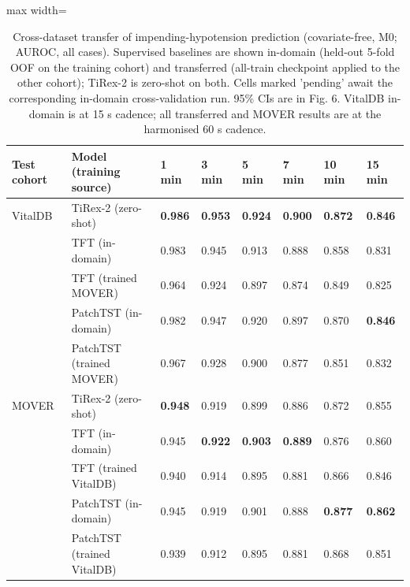 \documentclass[10pt]{article}
\begin{document}
\begin{table}[H]\centering\footnotesize
\caption{Cross-dataset transfer of impending-hypotension prediction (covariate-free, M0; AUROC, all cases). Supervised baselines are shown in-domain (held-out 5-fold OOF on the training cohort) and transferred (all-train checkpoint applied to the other cohort); TiRex-2 is zero-shot on both. Cells marked 'pending' await the corresponding in-domain cross-validation run. 95\% CIs are in Fig. 6. VitalDB in-domain is at 15 s cadence; all transferred and MOVER results are at the harmonised 60 s cadence.}
\begin{adjustbox}{max width=\textwidth}
\begin{tabular}{llllllll}
\toprule
\textbf{Test cohort} & \textbf{Model (training source)} & \textbf{1 min} & \textbf{3 min} & \textbf{5 min} & \textbf{7 min} & \textbf{10 min} & \textbf{15 min} \\
\midrule
VitalDB & TiRex-2 (zero-shot) & \textbf{0.986} & \textbf{0.953} & \textbf{0.924} & \textbf{0.900} & \textbf{0.872} & \textbf{0.846} \\
 & TFT (in-domain) & 0.983 & 0.945 & 0.913 & 0.888 & 0.858 & 0.831 \\
 & TFT (trained MOVER) & 0.964 & 0.924 & 0.897 & 0.874 & 0.849 & 0.825 \\
 & PatchTST (in-domain) & 0.982 & 0.947 & 0.920 & 0.897 & 0.870 & \textbf{0.846} \\
 & PatchTST (trained MOVER) & 0.967 & 0.928 & 0.900 & 0.877 & 0.851 & 0.832 \\
MOVER & TiRex-2 (zero-shot) & \textbf{0.948} & 0.919 & 0.899 & 0.886 & 0.872 & 0.855 \\
 & TFT (in-domain) & 0.945 & \textbf{0.922} & \textbf{0.903} & \textbf{0.889} & 0.876 & 0.860 \\
 & TFT (trained VitalDB) & 0.940 & 0.914 & 0.895 & 0.881 & 0.866 & 0.846 \\
 & PatchTST (in-domain) & 0.945 & 0.919 & 0.901 & 0.888 & \textbf{0.877} & \textbf{0.862} \\
 & PatchTST (trained VitalDB) & 0.939 & 0.912 & 0.895 & 0.881 & 0.868 & 0.851 \\
\bottomrule
\end{tabular}
\end{adjustbox}
\end{table}
\end{document}
